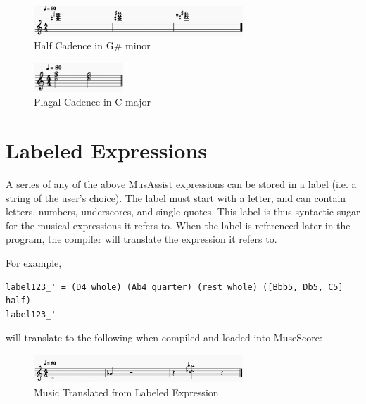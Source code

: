 \documentclass{report}
\begin{document}
\begin{figure}[h!]
\centering
\includegraphics[width=0.7\textwidth]{images/half}
  \caption{Half Cadence in G\# minor}
\end{figure}

\begin{figure}[h!]
\centering
\includegraphics[width=0.3\textwidth]{images/plagal}
  \caption{Plagal Cadence in C major}
\end{figure}


\section{Labeled Expressions}
\label{sec:labels}
A series of any of the above MusAssist expressions can be stored in a label (i.e. a string of the user's choice). The label must start with a letter, and can contain letters, numbers, underscores, and single quotes. This label is thus syntactic sugar for the musical expressions it refers to. When the label is referenced later in the program, the compiler will translate the expression it refers to. 

For example,
\begin{verbatim}
label123_' = (D4 whole) (Ab4 quarter) (rest whole) ([Bbb5, Db5, C5] half) 
label123_'
\end{verbatim}

will translate to the following when compiled and loaded into MuseScore:

\begin{figure}[h!]
\centering
\includegraphics[width=0.7\textwidth]{images/label}
  \caption{Music Translated from Labeled Expression}
\end{figure}

\end{document}
